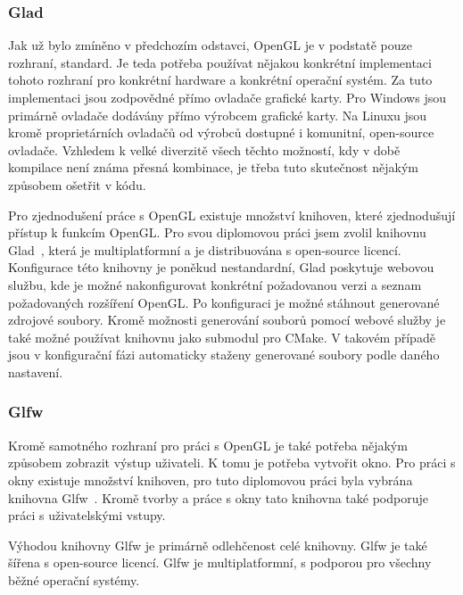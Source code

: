 \documentclass[czech,master]{diploma}
\begin{document}
\subsubsection*{Glad}
Jak už bylo zmíněno v předchozím odstavci, OpenGL je v podstatě pouze rozhraní, standard. Je teda potřeba používat nějakou konkrétní implementaci tohoto rozhraní pro konkrétní hardware a konkrétní operační systém. Za tuto implementaci jsou zodpovědné přímo ovladače grafické karty. Pro Windows jsou primárně ovladače dodávány přímo výrobcem grafické karty. Na Linuxu jsou kromě proprietárních ovladačů od výrobců dostupné i komunitní, open-source ovladače. Vzhledem k velké diverzitě všech těchto možností, kdy v době kompilace není známa přesná kombinace, je třeba tuto skutečnost nějakým způsobem ošetřit v kódu.\par
Pro zjednodušení práce s OpenGL existuje množství knihoven, které zjednodušují přístup k funkcím OpenGL\@. Pro svou diplomovou práci jsem zvolil knihovnu Glad~\cite{sourceGlad}, která je multiplatformní a je distribuována s open-source licencí. Konfigurace této knihovny je poněkud nestandardní, Glad poskytuje webovou službu, kde je možné nakonfigurovat konkrétní požadovanou verzi a seznam požadovaných rozšíření OpenGL\@. Po konfiguraci je možné stáhnout generované zdrojové soubory. Kromě možnosti generování souborů pomocí webové služby je také možné používat knihovnu jako submodul pro CMake. V takovém případě jsou v konfigurační fázi automaticky staženy generované soubory podle daného nastavení.

\subsubsection*{Glfw}
Kromě samotného rozhraní pro práci s OpenGL je také potřeba nějakým způsobem zobrazit výstup uživateli. K tomu je potřeba vytvořit okno. Pro práci s okny existuje množství knihoven, pro tuto diplomovou práci byla vybrána knihovna Glfw~\cite{sourceGLFW}. Kromě tvorby a práce s okny tato knihovna také podporuje práci s uživatelskými vstupy.\par
Výhodou knihovny Glfw je primárně odlehčenost celé knihovny. Glfw je také šířena s open-source licencí. Glfw je multiplatformní, s podporou pro všechny běžné operační systémy.
\end{document}
